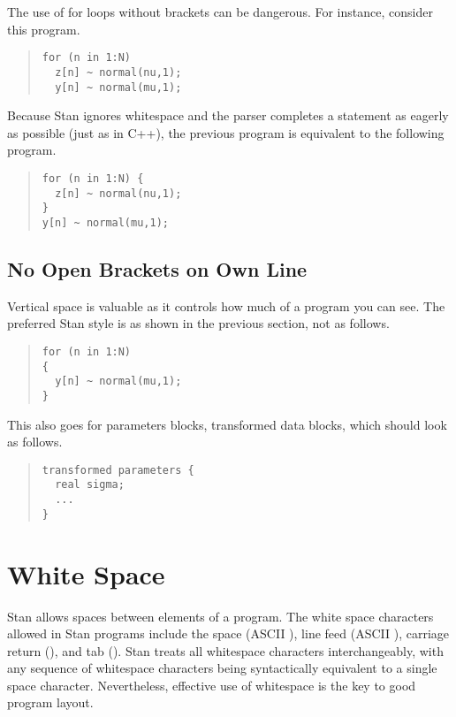 The use of for loops without brackets can be dangerous.  For instance,
consider this program.
%
\begin{quote}
\begin{Verbatim}  
for (n in 1:N)
  z[n] ~ normal(nu,1);
  y[n] ~ normal(mu,1);
\end{Verbatim}
\end{quote}
%
Because Stan ignores whitespace and the parser completes a statement
as eagerly as possible (just as in C++), the previous program is
equivalent to the following program.
%
\begin{quote}
\begin{Verbatim}  
for (n in 1:N) {
  z[n] ~ normal(nu,1);
}
y[n] ~ normal(mu,1);
\end{Verbatim}
\end{quote}
%



\subsection{No Open Brackets on Own Line}

Vertical space is valuable as it controls how much of a program you
can see.  The preferred Stan style is as shown in the previous
section, not as follows.
%
\begin{quote}
\begin{Verbatim}
for (n in 1:N) 
{
  y[n] ~ normal(mu,1);
}
\end{Verbatim}
\end{quote}
%
This also goes for parameters blocks, transformed data blocks, 
which should look as follows.
%
\begin{quote}
\begin{Verbatim}
transformed parameters {
  real sigma;
  ...
}
\end{Verbatim}
\end{quote}
%




\section{White Space}

Stan allows spaces between elements of a program.  The white space
characters allowed in Stan programs include the space (ASCII
), line feed (ASCII ), carriage return
(), and tab ().  Stan treats all whitespace
characters interchangeably, with any sequence of whitespace characters
being syntactically equivalent to a single space character.
Nevertheless, effective use of whitespace is the key to good program
layout.


